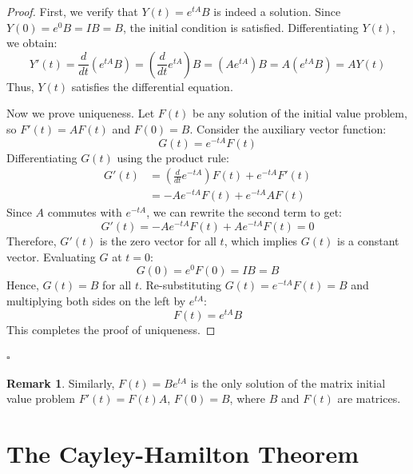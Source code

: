 \documentclass[12pt,a4paper]{report}
\theoremstyle{definition}
\newtheorem{remark}[theorem]{Remark}
\numberwithin{equation}{chapter}
\begin{document}
\begin{proof}
First, we verify that $Y(t) = e^{tA}B$ is indeed a solution. Since $Y(0) = e^0 B = I B = B$, the initial condition is satisfied. Differentiating $Y(t)$, we obtain:
\begin{equation}
Y'(t) = \frac{d}{dt} \left( e^{tA}B \right) = \left( \frac{d}{dt} e^{tA} \right) B = \left( A e^{tA} \right) B = A \left( e^{tA}B \right) = AY(t)
\end{equation}
Thus, $Y(t)$ satisfies the differential equation.

Now we prove uniqueness. Let $F(t)$ be any solution of the initial value problem, so $F'(t) = AF(t)$ and $F(0) = B$. Consider the auxiliary vector function:
\begin{equation}
G(t) = e^{-tA}F(t)
\end{equation}
Differentiating $G(t)$ using the product rule:
\begin{equation}
\begin{aligned}
G'(t) &= \left( \frac{d}{dt} e^{-tA} \right) F(t) + e^{-tA} F'(t) \\
      &= -A e^{-tA} F(t) + e^{-tA} A F(t)
\end{aligned}
\end{equation}
Since $A$ commutes with $e^{-tA}$, we can rewrite the second term to get:
\begin{equation}
G'(t) = -A e^{-tA} F(t) + A e^{-tA} F(t) = 0
\end{equation}
Therefore, $G'(t)$ is the zero vector for all $t$, which implies $G(t)$ is a constant vector. Evaluating $G$ at $t = 0$:
\begin{equation}
G(0) = e^0 F(0) = I B = B
\end{equation}
Hence, $G(t) = B$ for all $t$. Re-substituting $G(t) = e^{-tA}F(t) = B$ and multiplying both sides on the left by $e^{tA}$:
\begin{equation}
F(t) = e^{tA} B
\end{equation}
This completes the proof of uniqueness.
\end{proof}
\hfill $\square$

\begin{remark}
Similarly, $F(t) = B e^{tA}$ is the only solution of the matrix initial value problem $F'(t) = F(t)A$, $F(0) = B$, where $B$ and $F(t)$ are matrices.
\end{remark}


\chapter{The Cayley-Hamilton Theorem}
\end{document}
